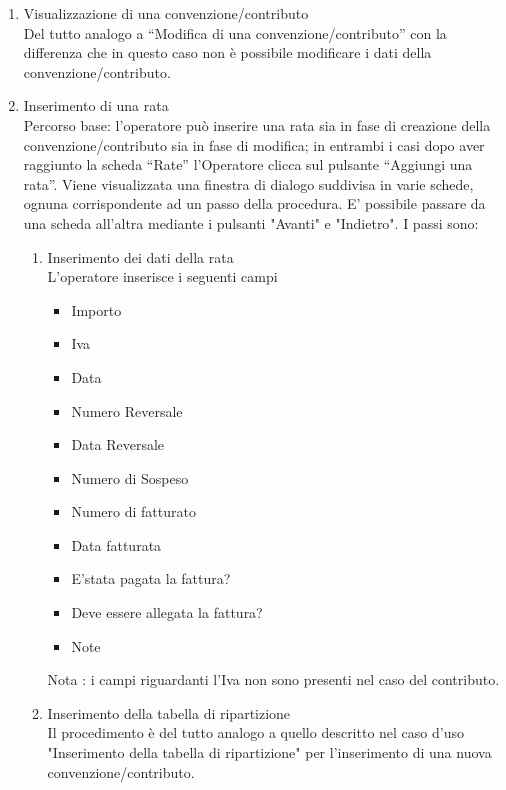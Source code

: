 \begin{enumerate}
\item Visualizzazione di una convenzione/contributo\\
 
  Del tutto analogo a ``Modifica di una convenzione/contributo'' con la differenza che in questo caso non è possibile modificare i dati della
  convenzione/contributo.
  
  
  
\item Inserimento di una rata\\
Percorso base:
l'operatore può inserire una rata sia in fase di creazione della convenzione/contributo sia in fase di modifica; in entrambi i casi dopo aver raggiunto
la scheda ``Rate'' l'Operatore clicca sul pulsante ``Aggiungi una rata''.  
Viene visualizzata una finestra di dialogo suddivisa in varie schede,
ognuna corrispondente ad un passo della procedura. E' possibile passare da una scheda all'altra mediante i pulsanti "Avanti" e "Indietro". I passi sono:
\begin{enumerate}
  \item Inserimento dei dati della rata\\
  
  L'operatore inserisce i seguenti campi
    \begin{itemize}
    \item Importo
    \item Iva
    \item Data
    \item Numero Reversale
    \item Data Reversale
    \item Numero di Sospeso
    \item Numero di fatturato
    \item Data fatturata
    \item E'stata pagata la fattura?
    \item Deve essere allegata la fattura?
    \item Note
    \end{itemize}
    
   Nota : i campi riguardanti l'Iva non sono presenti nel caso del contributo.

   
  \item Inserimento della tabella di ripartizione\\
  
  Il procedimento è del tutto analogo  a quello descritto nel caso d'uso "Inserimento della tabella di ripartizione" per l'inserimento di 
  una nuova convenzione/contributo. 
\end{enumerate}


\end{enumerate}
